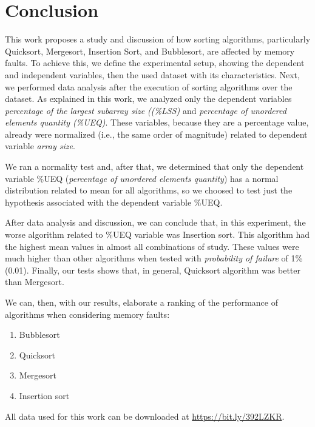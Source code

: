 \section{Conclusion}

This work proposes a study and discussion of how sorting algorithms, particularly Quicksort, Mergesort, Insertion Sort, and Bubblesort, are affected by memory faults. To achieve this, we define the experimental setup, showing the dependent and independent variables, then the used dataset with its characteristics. Next, we performed data analysis after the execution of sorting algorithms over the dataset. As explained in this work, we analyzed only the dependent variables \textit{percentage of the largest subarray size ((\%LSS)} and \textit{percentage of unordered elements quantity (\%UEQ)}. These variables, because they are a percentage value, already were normalized (i.e., the same order of magnitude) related to dependent variable \textit{array size}.

We ran a normality test and, after that, we determined that only the dependent variable \%UEQ (\textit{percentage of unordered elements quantity}) has a normal distribution related to mean for all algorithms, so we choosed to test just the hypothesis associated with the dependent variable \%UEQ.

After data analysis and discussion, we can conclude that, in this experiment, the worse algorithm related to \%UEQ variable was Insertion sort. This algorithm had the highest mean values in almost all combinations of study. These values were much higher than other algorithms when tested with \textit{probability of failure} of 1\% (0.01). Finally, our tests shows that, in general, Quicksort algorithm was better than Mergesort.

We can, then, with our results, elaborate a ranking of the performance of algorithms when considering memory faults:
\begin{enumerate}
    \item Bubblesort
    \item Quicksort
    \item Mergesort
    \item Insertion sort
\end{enumerate}

All data used for this work can be downloaded at \href{https://bit.ly/392LZKR}{https://bit.ly/392LZKR}.